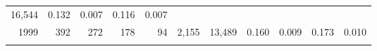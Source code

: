 \documentclass[]{article}
\begin{document}
\begin{longtable}[]{@{}rrrrrrrrrrr@{}}
\begin{minipage}[t]{0.05\columnwidth}
16,544\strut
\end{minipage} & \begin{minipage}[t]{0.09\columnwidth}\raggedleft\strut
0.132\strut
\end{minipage} & \begin{minipage}[t]{0.05\columnwidth}\raggedleft\strut
0.007\strut
\end{minipage} & \begin{minipage}[t]{0.10\columnwidth}\raggedleft\strut
0.116\strut
\end{minipage} & \begin{minipage}[t]{0.04\columnwidth}\raggedleft\strut
0.007\strut
\end{minipage}\tabularnewline
\begin{minipage}[t]{0.06\columnwidth}\raggedleft\strut
1999\strut
\end{minipage} & \begin{minipage}[t]{0.07\columnwidth}\raggedleft\strut
392\strut
\end{minipage} & \begin{minipage}[t]{0.07\columnwidth}\raggedleft\strut
272\strut
\end{minipage} & \begin{minipage}[t]{0.07\columnwidth}\raggedleft\strut
178\strut
\end{minipage} & \begin{minipage}[t]{0.07\columnwidth}\raggedleft\strut
94\strut
\end{minipage} & \begin{minipage}[t]{0.07\columnwidth}\raggedleft\strut
2,155\strut
\end{minipage} & \begin{minipage}[t]{0.05\columnwidth}\raggedleft\strut
13,489\strut
\end{minipage} & \begin{minipage}[t]{0.09\columnwidth}\raggedleft\strut
0.160\strut
\end{minipage} & \begin{minipage}[t]{0.05\columnwidth}\raggedleft\strut
0.009\strut
\end{minipage} & \begin{minipage}[t]{0.10\columnwidth}\raggedleft\strut
0.173\strut
\end{minipage} & \begin{minipage}[t]{0.04\columnwidth}\raggedleft\strut
0.010\strut
\end{minipage}\tabularnewline
\begin{minipage}[t]{0.06\columnwidth}\raggedleft\strut

\end{minipage}
\end{longtable}
\end{document}
